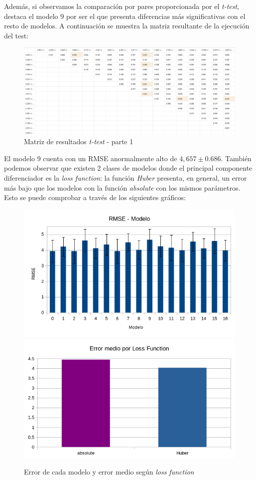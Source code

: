 \documentclass[12pt]{report} %
\begin{document}
    Además, si observamos la comparación por pares proporcionada por el \textit{t-test}, destaca el modelo 9 por ser el que presenta diferencias más significativas con el resto de modelos. A continuación se muestra la matriz resultante de la ejecución del test:

\begin{figure}[H]
    \includegraphics[width=\linewidth]{t-test.jpeg}
    \caption {\small Matriz de resultados \textit{t-test} - parte 1}
\end{figure}

    El modelo 9 cuenta con un RMSE anormalmente alto de $4,657\pm 0.686$. También podemos observar que existen 2 clases de modelos donde el principal componente diferenciador es la \textit{loss function}: la función \textit{Huber} presenta, en general, un error más bajo que los modelos con la función \textit{absolute} con los mismos parámetros. Esto se puede comprobar a través de los siguientes gráficos:

\begin{figure}[H]
    \includegraphics[width=0.45\linewidth]{RMSE-models.png}
    \includegraphics[width=0.45\linewidth]{error-lossfunction.png}
    \caption{\small Error de cada modelo y error medio según \textit{loss function}}
\end{figure}
\end{document}
